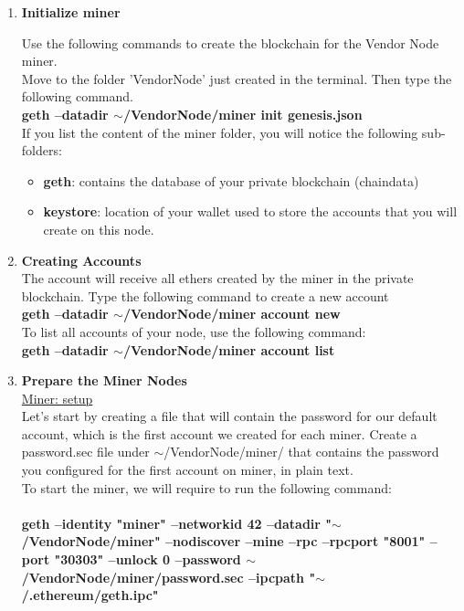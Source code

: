 \documentclass[journal,12pt,twocolumn]{IEEEtran}
\begin{document}
\begin{enumerate}
\item  \textbf{Initialize miner} 
  
Use the following commands to create the blockchain for the Vendor Node miner.\\
Move to the folder 'VendorNode' just created in the terminal. Then type the following command.\\
\textbf{ geth --datadir $\sim$/VendorNode/miner init genesis.json} \\
   
If you list the content of the miner folder, you will notice the following sub-folders:\\
\begin{itemize}
\item \textbf{geth}: contains the database of your private blockchain (chaindata)
\item \textbf{keystore}: location of your wallet used to store the accounts that you will create on this node.\\
\end{itemize}

\item \textbf{Creating Accounts} \\
The account will receive all ethers created by the miner in the private blockchain. Type the following command to create a new account\\
\textbf{geth --datadir $\sim$/VendorNode/miner account new}\\

 
 To list all accounts of your node, use the following command:\\
 \textbf{geth --datadir $\sim$/VendorNode/miner account list}\\
 
\item \textbf{Prepare the Miner Nodes} \\
\underline{Miner: setup}\\
\hspace*{1cm} Let’s start by creating a file that will contain the password for our default account, which is the first account we created for each miner. Create a password.sec file under $\sim$/VendorNode/miner/ that contains the password you configured for the first account on miner, in plain text.\\
\hspace*{1cm}   To start the miner, we will require to run the following command:\\ \\
\textbf{ geth --identity "miner" --networkid 42 --datadir "$\sim$/VendorNode/miner" --nodiscover --mine --rpc --rpcport "8001" --port "30303" --unlock 0 --password $\sim$/VendorNode/miner/password.sec --ipcpath "$\sim$/.ethereum/geth.ipc"}\\


\end{enumerate}
\end{document}
